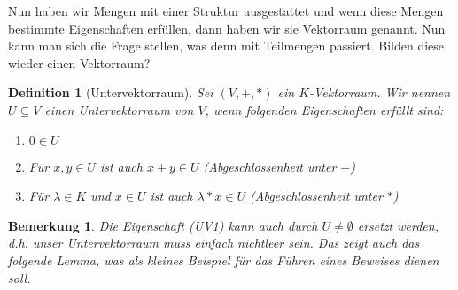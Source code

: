 \documentclass[ngerman, a4paper, 12pt]{scrreprt}
\newcounter{themcount}
\theoremstyle{plain}
\newtheorem{definition}[themcount]{Definition}
\newtheorem{bemerkung}[themcount]{Bemerkung}
\theoremstyle{proofstyle}
\begin{document}
	Nun haben wir Mengen mit einer Struktur ausgestattet und wenn diese Mengen bestimmte Eigenschaften erfüllen, dann haben wir sie Vektorraum genannt. Nun kann man sich die Frage stellen, was denn mit Teilmengen passiert. Bilden diese wieder einen Vektorraum?
	
	\begin{definition}[Untervektorraum]
		Sei $(V,+,*)$ ein $K$-Vektorraum. Wir nennen $U \subseteq V$ einen Untervektorraum von $V$, wenn folgenden Eigenschaften erfüllt sind:
		\begin{enumerate}[label=(UV\arabic*), leftmargin=*]
			\item $0 \in U$
			\item Für $x,y \in U$ ist auch $x+y \in U$ (Abgeschlossenheit unter $+$)
			\item Für $\lambda \in K$ und $x \in U$ ist auch $\lambda * x \in U$ (Abgeschlossenheit unter $*$)
		\end{enumerate}
	\end{definition}

	\begin{bemerkung}
		Die Eigenschaft (UV1) kann auch durch $U \neq \emptyset$ ersetzt werden, d.h. unser Untervektorraum muss einfach nichtleer sein. Das zeigt auch das folgende Lemma, was als kleines Beispiel für das Führen eines Beweises dienen soll.
	\end{bemerkung}
\end{document}
